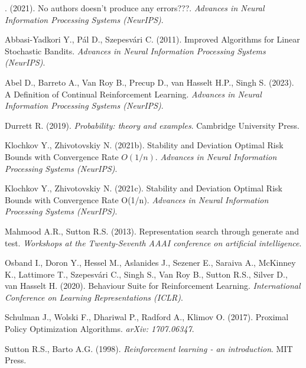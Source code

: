%
{ . (2021). No authors doesn't produce any errors???. \textit{Advances in Neural Information Processing Systems (NeurIPS)}.}

%
{Abbasi{-}Yadkori Y., P{\'{a}}l D., Szepesv{\'{a}}ri C. (2011). Improved Algorithms for Linear Stochastic Bandits. \textit{Advances in Neural Information Processing Systems (NeurIPS)}.}

%
{Abel D., Barreto A., Van Roy B., Precup D., van Hasselt H.P., Singh S. (2023). A Definition of Continual Reinforcement Learning. \textit{Advances in Neural Information Processing Systems (NeurIPS)}.}

%
{Durrett R. (2019). \textit{Probability: theory and examples}. Cambridge University Press.}

%
{Klochkov Y., Zhivotovskiy N. (2021b). Stability and Deviation Optimal Risk Bounds with Convergence Rate $ O (1/n) $. \textit{Advances in Neural Information Processing Systems (NeurIPS)}.}

%
{Klochkov Y., Zhivotovskiy N. (2021c). Stability and Deviation Optimal Risk Bounds with Convergence Rate {\textdollar}O(1/n){\textdollar}. \textit{Advances in Neural Information Processing Systems (NeurIPS)}.}

%
{Mahmood A.R., Sutton R.S. (2013). Representation search through generate and test. \textit{Workshops at the Twenty-Seventh AAAI conference on artificial intelligence}.}

%
{Osband I., Doron Y., Hessel M., Aslanides J., Sezener E., Saraiva A., McKinney K., Lattimore T., Szepesv{\'{a}}ri C., Singh S., Van Roy B., Sutton R.S., Silver D., van Hasselt H. (2020). Behaviour Suite for Reinforcement Learning. \textit{International Conference on Learning Representations (ICLR)}.}

%
{Schulman J., Wolski F., Dhariwal P., Radford A., Klimov O. (2017). Proximal Policy Optimization Algorithms. \textit{arXiv: 1707.06347}.}

%
{Sutton R.S., Barto A.G. (1998). \textit{Reinforcement learning - an introduction}. MIT Press.}

